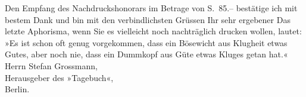 \begin{ledgroupsized}[t]{13cm}
           Den Empfang des Nachdruckshonorars im Betrage von S. 85.– bestätige ich mit
                    bestem Dank und bin mit den verbindlichsten Grüssen\pend
           \pstart Ihr sehr ergebener\pend{}{\bigskip}\pstart
           \noindent{}Das letzte Aphorisma, wenn Sie es vielleicht noch nachträglich drucken
                        wollen, lautet:\pend
           \pstart
           »Es ist schon oft genug vorgekommen, dass ein Bösewicht aus Klugheit etwas
                        Gutes, aber noch nie, dass ein Dummkopf aus Güte etwas Kluges getan
                        hat.«\pend
           {\bigskip}\pstart
           \noindent{}Herrn Stefan Grossmann,{\\}Herausgeber des »Tagebuch«,{\\}Berlin.\pend
           
         
         \endnumbering{}\end{ledgroupsized}  \newcommand{\dateiname}{L02476}\newcommand{\titel}{Arthur Schnitzler an Stefan Großmann, 31. 5. 1926}\newcommand{\editorInnen}{Martin Anton Müller und Gerd-Hermann Susen}
      